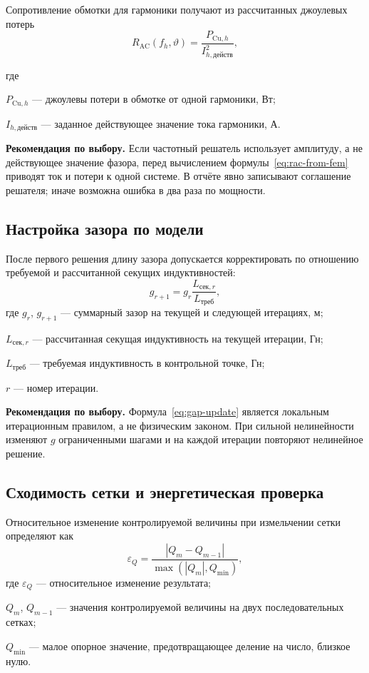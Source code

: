 \documentclass[14pt,a4paper]{extarticle}
\newcommand{\recommend}{\par\noindent\textbf{Рекомендация по выбору.} }
\newenvironment{whereblock}
 {\par\noindent где\par
  \begin{list}{}{\setlength{\leftmargin}{12.5mm}
                  \setlength{\itemindent}{-12.5mm}
                  \setlength{\itemsep}{0pt}
                  \setlength{\parsep}{0pt}
                  \setlength{\topsep}{0pt}}}
 {\end{list}}
\newcommand{\whereitem}[2]{\item[] #1 --- #2}
\begin{document}
Сопротивление обмотки для гармоники получают из рассчитанных джоулевых
потерь
\begin{equation}
 R_{\text{AC}}(f_h,\vartheta)=
 \frac{P_{\text{Cu},h}}
 {I_{h,\text{действ}}^2},
 \label{eq:rac-from-fem}
\end{equation}
\begin{whereblock}
\whereitem{$P_{\text{Cu},h}$}{джоулевы потери в обмотке от одной гармоники,
Вт;}
\whereitem{$I_{h,\text{действ}}$}{заданное действующее значение тока
гармоники, А.}
\end{whereblock}

\recommend Если частотный решатель использует амплитуду, а не действующее
значение фазора, перед вычислением формулы~\eqref{eq:rac-from-fem} приводят
ток и потери к одной системе. В отчёте явно записывают соглашение решателя;
иначе возможна ошибка в два раза по мощности.

\subsection{Настройка зазора по модели}

После первого решения длину зазора допускается корректировать по
отношению требуемой и рассчитанной секущих индуктивностей:
\begin{equation}
 g_{r+1}=g_r
 \frac{L_{\text{сек},r}}{L_{\text{треб}}},
 \label{eq:gap-update}
\end{equation}
где $g_r$, $g_{r+1}$ --- суммарный зазор на текущей и следующей
итерациях, м;\par\noindent
$L_{\text{сек},r}$ --- рассчитанная секущая индуктивность на текущей
итерации, Гн;\par\noindent
$L_{\text{треб}}$ --- требуемая индуктивность в контрольной точке, Гн;\par\noindent
$r$ --- номер итерации.

\recommend Формула~\eqref{eq:gap-update} является локальным
итерационным правилом, а не физическим законом. При сильной
нелинейности изменяют $g$ ограниченными шагами и на каждой итерации
повторяют нелинейное решение.

\subsection{Сходимость сетки и энергетическая проверка}

Относительное изменение контролируемой величины при измельчении сетки
определяют как
\begin{equation}
 \varepsilon_Q=
 \frac{\left|Q_m-Q_{m-1}\right|}
 {\max\!\left(\left|Q_m\right|,Q_{\min}\right)},
 \label{eq:mesh-convergence}
\end{equation}
где $\varepsilon_Q$ --- относительное изменение результата;\par\noindent
$Q_m$, $Q_{m-1}$ --- значения контролируемой величины на двух
последовательных сетках;\par\noindent
$Q_{\min}$ --- малое опорное значение, предотвращающее деление на
число, близкое нулю.
\end{document}
